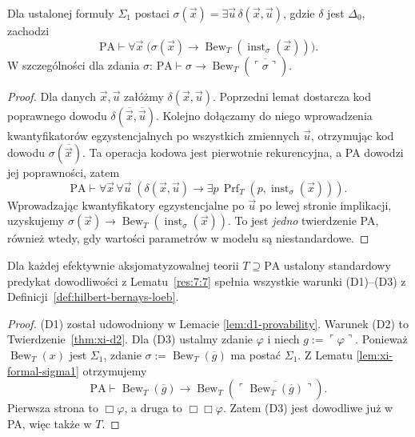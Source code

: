 \begin{lemat}
\label{lem:xi-formal-sigma1}
Dla ustalonej formuły $\Sigma_1$ postaci
$\sigma(\vec x)=\exists\vec u\,\delta(\vec x,\vec u)$,
gdzie $\delta$ jest $\Delta_0$, zachodzi
\[
\mathrm{PA}\vdash\forall\vec x\;
\bigl(\sigma(\vec x)\to
\operatorname{Bew}_T(\operatorname{inst}_\sigma(\vec x))\bigr).
\]
W szczególności dla zdania $\sigma$:
$\mathrm{PA}\vdash\sigma\to
\operatorname{Bew}_T(\overline{\ulcorner\sigma\urcorner})$.
\end{lemat}
\begin{proof}
Dla danych $\vec x,\vec u$ załóżmy
$\delta(\vec x,\vec u)$. Poprzedni lemat
dostarcza kod poprawnego dowodu
$\delta(\overline{\vec x},\overline{\vec u})$.
Kolejno dołączamy do niego wprowadzenia
kwantyfikatorów egzystencjalnych po wszystkich
zmiennych $\vec u$, otrzymując kod dowodu
$\sigma(\overline{\vec x})$. Ta operacja kodowa
jest pierwotnie rekurencyjna, a PA dowodzi jej
poprawności, zatem
\[
\mathrm{PA}\vdash
\forall\vec x\,\forall\vec u\;\left(
\delta(\vec x,\vec u)\to\exists p\,
\operatorname{Prf}_T(p,\operatorname{inst}_\sigma(\vec x))
\right).
\]
Wprowadzając kwantyfikatory egzystencjalne
po $\vec u$ po lewej stronie implikacji,
uzyskujemy $\sigma(\vec x)\to
\operatorname{Bew}_T(\operatorname{inst}_\sigma(\vec x))$.
To jest \emph{jedno} twierdzenie PA, również wtedy,
gdy wartości parametrów w modelu są niestandardowe.
\end{proof}

\begin{twierdzenie}
\label{thm:xi-hbl-verified}
Dla każdej efektywnie aksjomatyzowalnej teorii
$T\supseteq\mathrm{PA}$ ustalony standardowy
predykat dowodliwości z Lematu~\ref{res:7:7}
spełnia wszystkie warunki (D1)--(D3) z
Definicji~\ref{def:hilbert-bernays-loeb}.
\end{twierdzenie}
\begin{proof}
(D1) został udowodniony w Lemacie
\ref{lem:d1-provability}.
Warunek (D2) to Twierdzenie~\ref{thm:xi-d2}.
Dla (D3) ustalmy zdanie $\varphi$ i niech
$g:=\ulcorner\varphi\urcorner$. Ponieważ
$\operatorname{Bew}_T(x)$ jest $\Sigma_1$,
zdanie $\sigma:=\operatorname{Bew}_T(\overline g)$
ma postać $\Sigma_1$. Z Lematu
\ref{lem:xi-formal-sigma1} otrzymujemy
\[
\mathrm{PA}\vdash
\operatorname{Bew}_T(\overline g)\to
\operatorname{Bew}_T\left(
\overline{\ulcorner\operatorname{Bew}_T(\overline g)\urcorner}
\right).
\]
Pierwsza strona to $\Box\varphi$,
a druga to $\Box\Box\varphi$. Zatem (D3)
jest dowodliwe już w PA, więc także w $T$.
\end{proof}


